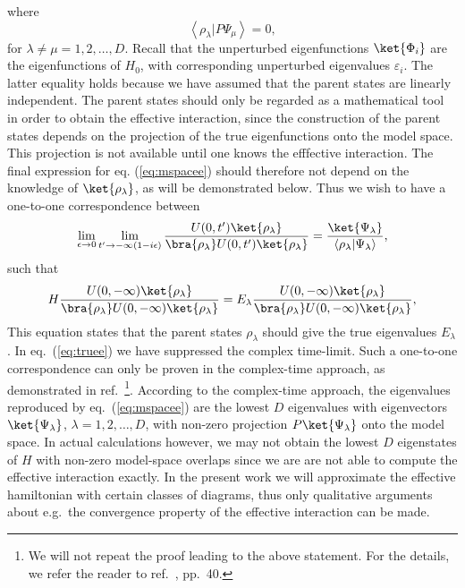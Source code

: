 \begin{itemize}
where
\begin{equation}
{\left\langle\rho_{\lambda} | P\Psi_{\mu} \right\rangle}=0,
\end{equation}
for $\lambda\neq\mu =1,2,\dots ,D$. Recall that the unperturbed
eigenfunctions $\ket{\Phi_i}$ are the eigenfunctions of $H_0$, with
corresponding unperturbed eigenvalues $\varepsilon_i$.
The latter equality holds because we
have assumed that the parent states are linearly independent.
The parent states should only be regarded as a mathematical tool in order
to obtain the effective interaction, since the construction of the parent
states depends on the projection of the true eigenfunctions onto the model
space. This projection is not available until one knows the efffective
interaction. The final expression for eq. (\ref{eq:mspacee}) should
therefore not depend on the knowledge of $\ket{\rho_{\lambda}}$, as will
be demonstrated below.
Thus we wish to have a one-to-one correspondence between
\begin{equation}
\lim_{\epsilon \rightarrow 0}
   \lim_{t'\rightarrow -\infty (1-i\epsilon )}
\frac{U(0,t' )\ket{\rho_{\lambda}} }
{ \bra{\rho_{\lambda}} U(0,t' )\ket{\rho_{\lambda}} }=
\frac{\ket{\Psi_{\lambda}}}
{\left\langle\rho_{\lambda} | \Psi_{\lambda} \right\rangle},
\end{equation}
such that 
\begin{equation}
H\frac{U(0,-\infty )\ket{\rho_{\lambda}} }
{ \bra{\rho_{\lambda}} U(0,-\infty )\ket{\rho_{\lambda}} }=
E_{\lambda}\frac{U(0,-\infty )\ket{\rho_{\lambda}} }
{ \bra{\rho_{\lambda}} U(0,-\infty )\ket{\rho_{\lambda}} },
\label{eq:truee}
\end{equation}
This equation states that the parent states $\rho_{\lambda}$ 
should give the true eigenvalues $E_{\lambda}$. In eq.\ (\ref{eq:truee})
we have suppressed the complex time-limit. Such a one-to-one correspondence
can only be proven in the complex-time approach, as demonstrated in ref.\ 
\cite{ko90}\footnote{We will not repeat the proof leading to the above statement.
For the details, we refer the reader to ref.\ \cite{ko90}, pp.\ 40.}. 
According to the complex-time approach, the eigenvalues
reproduced by eq.\ (\ref{eq:mspacee})
are the lowest $D$ eigenvalues with eigenvectors $\ket{\Psi_{\lambda}}$,
$\lambda =1,2,\dots ,D$, with non-zero projection $P\ket{\Psi_{\lambda}}$ onto
the model space. In actual calculations however, we may not obtain the 
lowest $D$ eigenstates of $H$ with non-zero model-space overlaps since we are
are not able to compute the effective interaction exactly. In the present
work we will approximate the effective hamiltonian with certain classes of 
diagrams, thus only qualitative arguments about e.g.\ the convergence
property of the effective interaction can be made. 
\end{itemize}

